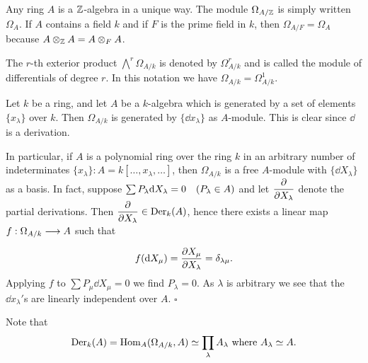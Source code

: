 \documentclass[../main]{subfiles}
\begin{document}
\newparagraph Any ring $A$ is a $\mathbb{Z}$-algebra in a unique way. The module $\Omega_{A / \mathbb{Z}}$ is simply written $\Omega_A$. If $A$ contains a field $k$ and if $F$ is the prime field in $k$, then $\Omega_{A / F}=\Omega_A$ because $A \otimes_{\mathbb{Z}} A=A \otimes_F A$.

The $r$-th exterior product $\bigwedge^r \Omega_{A / k}$ is denoted by $\Omega^r_{A / k}$ and is called the module of differentials of degree $r$. In this notation we have $\Omega_{A / k}=\Omega^1_{A / k}$.

\begin{parexample}\label{exa:26.01}
Let $k$ be a ring, and let $A$ be a $k$-algebra which is generated by a set of elements $\{x_\lambda\}$ over $k$. Then
$\Omega_{A / k}$ is generated by $\{\dd x_\lambda\}$ as $A$-module. This is clear since $\dd$ is a derivation.
 

In particular, if $A$ is a polynomial ring over the ring $k$ in an arbitrary number of indeterminates $\{x_\lambda\}: A=k[\dots, x_\lambda, \dots]$, then $\Omega_{A / k}$ is a free $A$-module with $\{\dd X_\lambda\}$ as a basis. In fact, suppose $\sum P_\lambda \dd X_\lambda=0 \for{P_\lambda \in A}$ and let $\dfrac{\partial }{\partial X_\lambda}$ denote the partial derivations. Then $\dfrac{\partial }{\partial X_\lambda} \in \operatorname{Der}_k(A)$, hence there exists a linear map $f: \Omega_{A / k} \varrightarrow{} A$ such that \[f(\mathrm{d}X_{\mu})=\dfrac{\partial X_\mu}{\partial X_\lambda}=\delta_{\lambda \mu}. \] Applying $f$ to $\sum P_{\mu} \dd X_{\mu}=0$ we find $P_\lambda=0$. As $\lambda$ is arbitrary we see that the $\dd x_\lambda'$s are linearly independent over $A$. $\square$

Note that \[\operatorname{Der}_k(A)=\operatorname{Hom}_A(\Omega_{A/k}, A) \simeq \prod_\lambda A_\lambda\text{ where } A_\lambda \simeq A.\] 
\end{parexample}
\end{document}
